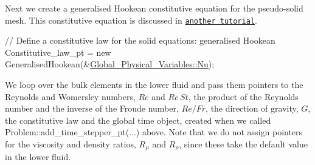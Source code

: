 Next we create a generalised Hookean constitutive equation for the pseudo-\/solid mesh. This constitutive equation is discussed in \href{../../../solid/disk_compression/html/index.html#hooke}{\tt another tutorial}.


\begin{DoxyCodeInclude}
 \textcolor{comment}{// Define a constitutive law for the solid equations: generalised Hookean}
 Constitutive\_law\_pt = \textcolor{keyword}{new} GeneralisedHookean(&\hyperlink{namespaceGlobal__Physical__Variables_a3962c36313826b19f216f6bbbdd6a477}{Global\_Physical\_Variables::Nu});

\end{DoxyCodeInclude}


We loop over the bulk elements in the lower fluid and pass them pointers to the Reynolds and Womersley numbers, $ Re $ and $ Re\, St $, the product of the Reynolds number and the inverse of the Froude number, $ Re/Fr $, the direction of gravity, $ G $, the constitutive law and the global time object, created when we called {\ttfamily Problem\+::add\+\_\+time\+\_\+stepper\+\_\+pt}(...) above. Note that we do not assign pointers for the viscosity and density ratios, $ R_\mu $ and $ R_\rho $, since these take the default value in the lower fluid.


